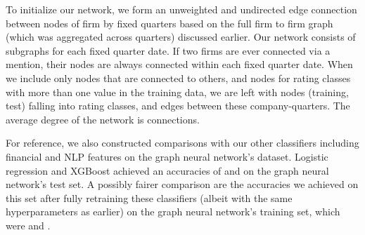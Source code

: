 \documentclass{article}[11pt]
\begin{document}

    To initialize our network, we form an unweighted and undirected edge connection between nodes of firm by fixed quarters based on the full firm to firm graph (which was aggregated across quarters) discussed earlier. Our network consists of subgraphs for each fixed quarter date. If two firms are ever connected via a mention, their nodes are always connected within each fixed quarter date. When we include only nodes that are connected to others, and nodes for rating classes with more than one value in the training data, we are left with \numNodes \space nodes (\numTrainNodes \space training, \numTestNodes \space test) falling into \gnnNumClasses \space rating classes, and \numEdges \space edges between these company-quarters. The average degree of the network is \averageDegree \space connections.

    For reference, we also constructed comparisons with our other classifiers including financial and NLP features on the graph neural network's dataset. Logistic regression and XGBoost achieved an accuracies of \pretrainedLRAccuracy \space and \pretrainedXGBAccuracy \space on the graph neural network's test set. A possibly fairer comparison are the accuracies we achieved on this set after fully retraining these classifiers (albeit with the same hyperparameters as earlier) on the graph neural network's training set, which were \retrainLRAccuracy \space and \retrainXGBAccuracy.
\end{document}
